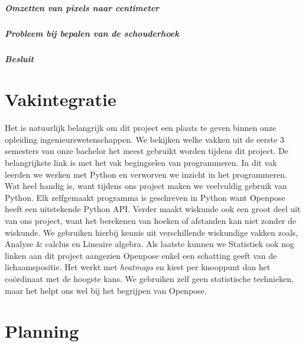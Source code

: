 \documentclass[a4paper,twoside,kulak]{kulakreport}
\begin{document}
\paragraph{Omzetten van pixels naar centimeter}

\paragraph{Probleem bij bepalen van de schouderhoek}

\paragraph{Besluit}


\chapter{Vakintegratie}
Het is natuurlijk belangrijk om dit project een plaats te geven binnen onze opleiding ingenieurswetenschappen. We bekijken welke vakken uit de eerste 3 semesters van onze bachelor het meest gebruikt worden tijdens dit project. De belangrijkste link is met het vak begingselen van programmeren. In dit vak leerden we werken met Python en verworven we inzicht in het programmeren. Wat heel handig is, want tijdens ons project maken we veelvuldig gebruik van Python. Elk zelfgemaakt programma is geschreven in Python want Openpose heeft een uitstekende Python API. Verder maakt wiskunde ook een groot deel uit van ons project, want het berekenen van hoeken of afstanden kan niet zonder de wiskunde. We gebruiken hierbij kennis uit verschillende wiskundige vakken zoals, Analyse \& calclus en Lineaire algebra. Als laatste kunnen we Statistiek ook nog linken aan dit project aangezien Openpose enkel een schatting geeft van de lichaamspositie. Het werkt met \textit{heatmaps} en kiest per knooppunt dan het coördinaat met de hoogste kans. We gebruiken zelf geen statistische technieken, maar het helpt ons wel bij het begrijpen van Openpose.

\chapter{Planning}
\end{document}
